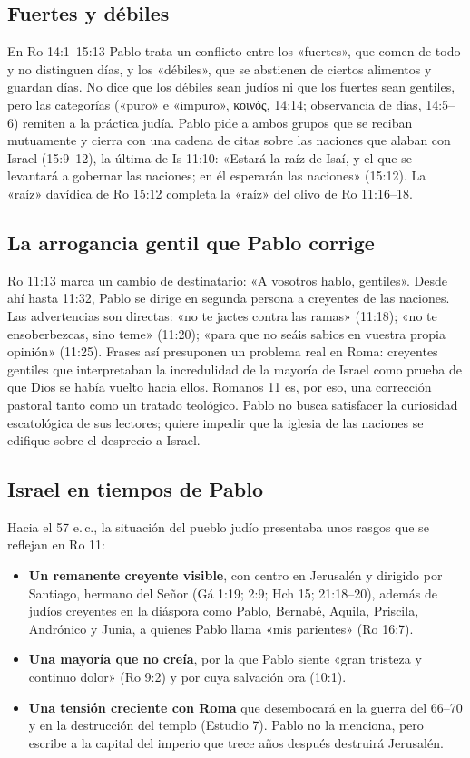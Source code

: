 \documentclass[11pt,letterpaper]{article}
\newcommand{\grc}[1]{\foreignlanguage{ancientgreek}{#1}}
\begin{document}
\subsection{Fuertes y débiles}
En Ro 14:1--15:13 Pablo trata un conflicto entre los «fuertes», que comen de todo y no distinguen días, y los «débiles», que se abstienen de ciertos alimentos y guardan días. No dice que los débiles sean judíos ni que los fuertes sean gentiles, pero las categorías («puro» e «impuro», \grc{κοινός}, 14:14; observancia de días, 14:5--6) remiten a la práctica judía. Pablo pide a ambos grupos que se reciban mutuamente y cierra con una cadena de citas sobre las naciones que alaban con Israel (15:9--12), la última de Is 11:10: «Estará la raíz de Isaí, y el que se levantará a gobernar las naciones; en él esperarán las naciones» (15:12). La «raíz» davídica de Ro 15:12 completa la «raíz» del olivo de Ro 11:16--18.

\subsection{La arrogancia gentil que Pablo corrige}
Ro 11:13 marca un cambio de destinatario: «A vosotros hablo, gentiles». Desde ahí hasta 11:32, Pablo se dirige en segunda persona a creyentes de las naciones. Las advertencias son directas: «no te jactes contra las ramas» (11:18); «no te ensoberbezcas, sino teme» (11:20); «para que no seáis sabios en vuestra propia opinión» (11:25). Frases así presuponen un problema real en Roma: creyentes gentiles que interpretaban la incredulidad de la mayoría de Israel como prueba de que Dios se había vuelto hacia ellos. Romanos 11 es, por eso, una corrección pastoral tanto como un tratado teológico. Pablo no busca satisfacer la curiosidad escatológica de sus lectores; quiere impedir que la iglesia de las naciones se edifique sobre el desprecio a Israel.

\subsection{Israel en tiempos de Pablo}
Hacia el 57 e.\,c., la situación del pueblo judío presentaba unos rasgos que se reflejan en Ro 11:
\begin{itemize}
\item \textbf{Un remanente creyente visible}, con centro en Jerusalén y dirigido por Santiago, hermano del Señor (Gá 1:19; 2:9; Hch 15; 21:18--20), además de judíos creyentes en la diáspora como Pablo, Bernabé, Aquila, Priscila, Andrónico y Junia, a quienes Pablo llama «mis parientes» (Ro 16:7).
\item \textbf{Una mayoría que no creía}, por la que Pablo siente «gran tristeza y continuo dolor» (Ro 9:2) y por cuya salvación ora (10:1).
\item \textbf{Una tensión creciente con Roma} que desembocará en la guerra del 66--70 y en la destrucción del templo (Estudio 7). Pablo no la menciona, pero escribe a la capital del imperio que trece años después destruirá Jerusalén.
\end{itemize}
\end{document}
